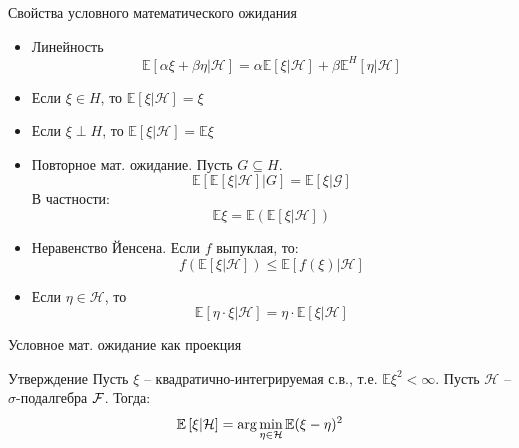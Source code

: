 \documentclass{beamer}
\begin{document}
\begin{frame}{Свойства условного математического ожидания}
    \begin{itemize}
        \item Линейность
        $$
            \mathbb{E}\left[ \alpha \xi + \beta \eta | \mathcal{H} \right]
            = \alpha \mathbb{E}\left[ \xi  | \mathcal{H} \right] + \beta \mathbb{E}^H \left[ \eta  | \mathcal{H} \right]
        $$

        \item Если $\xi \in H$, то $\mathbb{E}\left[ \xi | \mathcal{H} \right] = \xi$

        \item Если $\xi \perp H$, то $\mathbb{E}\left[ \xi | \mathcal{H} \right] = \mathbb{E} \xi$
        
        \item Повторное мат. ожидание. Пусть $G \subseteq H$. 
        $$
            \mathbb{E} \left[ \mathbb{E}\left[ \xi | \mathcal{H} \right] | G \right] = \mathbb{E}\left[ \xi | \mathcal{G} \right]
        $$
        В частности:
        $$
            \mathbb{E} \xi = \mathbb{E} (\mathbb{E}\left[ \xi | \mathcal{H} \right]) 
        $$

        \item Неравенство Йенсена. Если $f$ выпуклая, то:
        $$
            f(\mathbb{E}\left[ \xi | \mathcal{H} \right]) \leq \mathbb{E}\left[ f(\xi) | \mathcal{H} \right]
        $$

        \item Если $\eta \in \mathcal{H}$, то
        $$
            \mathbb{E} \left[ \eta\cdot\xi | \mathcal{H} \right] = \eta \cdot \mathbb{E}\left[ \xi | \mathcal{H} \right] 
        $$
    \end{itemize}
\end{frame}

\begin{frame}{Условное мат. ожидание как проекция}
    \begin{block}{Утверждение}
        Пусть $\xi$ -- квадратично-интегрируемая с.в., т.е. $\mathbb{E} \xi^2 < \infty$. Пусть $\mathcal{H}$ -- $\sigma$-подалгебра $\mathcal{F}$. Тогда:
        $$
            \mathbb{E}\left[ \xi | \mathcal{H} \right] = \arg \min_{\eta \in \mathcal{H}} \mathbb{E} (\xi-\eta)^2
        $$
    \end{block}
\end{frame}
\end{document}

